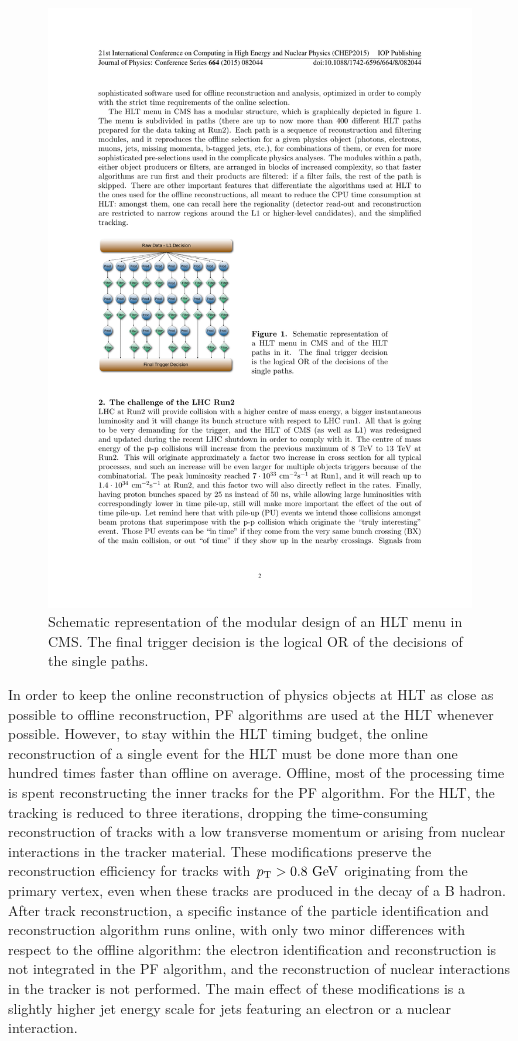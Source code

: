 \begin{figure}\centering
\includegraphics[width=.7\textwidth]{figs/cms/HLTschematic.pdf}
\caption{Schematic representation of the modular design of an HLT menu in CMS. The final trigger decision is the logical OR of the decisions of the single paths.
\label{fig:modular}}
\end{figure}

In order to keep the online reconstruction of physics objects at HLT as
close as possible to offline reconstruction, PF algorithms are used at
the HLT whenever possible. 
However, to stay within the HLT timing budget, the online
reconstruction of a single event for the HLT must be done more than one
hundred times faster than offline on average.
Offline, most of the processing time is spent reconstructing the inner
tracks for the PF algorithm. For the HLT, the tracking is reduced to three iterations, 
dropping the time-consuming reconstruction of tracks with a low
transverse momentum or arising from nuclear interactions in the
tracker material. These modifications preserve the reconstruction efficiency for
tracks with $p_{\mathrm{T}}>0.8\,\,\text{Ge\hspace{-.08em}V}$ originating from the primary vertex, even
when these tracks are produced in the decay of a B hadron.
After track reconstruction, a specific instance of the particle identification and reconstruction algorithm runs online, 
with only two minor differences with respect to the offline algorithm:
the electron identification and reconstruction is not integrated in
the PF algorithm, and the reconstruction of nuclear interactions in the tracker is not performed.
The main effect of these modifications is a slightly higher jet energy
scale for jets featuring an electron or a nuclear interaction.


